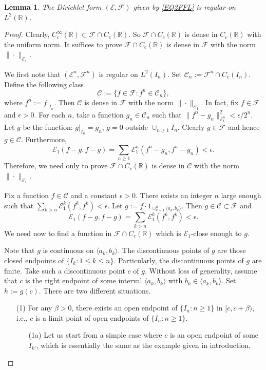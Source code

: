 \documentclass[a4paper]{amsart}
\newtheorem{lemma}[theorem]{Lemma}
\theoremstyle{definition}
\theoremstyle{remark}
\numberwithin{equation}{section}
\begin{document}
\begin{lemma}\label{LM212}
The Dirichlet form $({{\mathcal{E}}},{{\mathcal{F}}})$ given by \eqref{EQ2FFL} is regular on $L^2(\mathbb{R})$.
\end{lemma}
\begin{proof}
Clearly, $C_c^\infty(\mathbb{R})\subset {{\mathcal{F}}}\cap C_c(\mathbb{R})$. So ${{\mathcal{F}}}\cap C_c(\mathbb{R})$ is dense in $C_c(\mathbb{R})$ with the uniform norm. It suffices to prove ${{\mathcal{F}}}\cap C_c(\mathbb{R})$ is dense in ${{\mathcal{F}}}$ with the norm $\|\cdot\|_{{{\mathcal{E}}}_1}$.

We first note that $({{\mathcal{E}}}^n,{{\mathcal{F}}}^n)$ is regular on $L^2(I_n)$. Set $\mathcal{C}_n:={{\mathcal{F}}}^n\cap C_c(I_n)$. Define the following class
\[
	\mathcal{C}:= \{f\in {{\mathcal{F}}}: f^n\in \mathcal{C}_n\},
\]
where $f^n:=f|_{I_n}$. Then $\mathcal{C}$ is dense in ${{\mathcal{F}}}$ with the norm $\|\cdot\|_{{{\mathcal{E}}}_1}$. In fact, fix $f\in {{\mathcal{F}}}$ and $\epsilon>0$. For each $n$, take a function $g_n\in \mathcal{C}_n$ such that $\|f^n-g_n\|^2_{{{\mathcal{E}}}^n_1}<\epsilon/2^n$. Let $g$ be the function: $g|_{I_n}=g_n$, $g=0$ outside $\cup_{n\geq 1}I_n$. Clearly $g\in {{\mathcal{F}}}$ and hence $g\in \mathcal{C}$. Furthermore,
\[
	{{\mathcal{E}}}_1(f-g,f-g)=\sum_{n\geq 1}{{\mathcal{E}}}^n_1(f^n-g_n,f^n-g_n) <\epsilon.
\]
Therefore, we need only to prove ${{\mathcal{F}}}\cap C_c(\mathbb{R})$ is dense in $\mathcal{C}$ with the norm $\|\cdot\|_{{{\mathcal{E}}}_1}$.

Fix a function $f\in \mathcal{C}$ and a constant $\epsilon>0$. There exists an integer $n$ large enough such that $\sum_{k>n}{{\mathcal{E}}}_1^k(f^k,f^k)<\epsilon $. Let $g:=f\cdot 1_{\cup_{k=1}^n\langle a_k, b_k\rangle}$. Then $g\in \mathcal{C}\subset {{\mathcal{F}}}$ and \[
	{{\mathcal{E}}}_1(f-g,f-g)=\sum_{k>n}{{\mathcal{E}}}_1^k(f^k,f^k)<\epsilon.
\]
We need now to find a function in ${{\mathcal{F}}}\cap C_c(\mathbb{R})$ which is ${{\mathcal{E}}}_1$-close enough to $g$.

Note that $g$ is continuous on $\langle a_k, b_k\rangle$. The discontinuous points of $g$ are those closed endpoints of $\{I_k: 1\leq k\leq n\}$. Particularly, the discontinuous points of $g$ are finite. Take such a discontinuous point $c$ of $g$. Without loss of generality, assume that $c$ is the right endpoint of some interval $\langle a_k, b_k\rangle$ with $b_k\in \langle a_k, b_k\rangle$.  Set $h:=g(c)$. There are two different situations.
\begin{itemize}
\item[(1)] For any $\beta>0$, there exists an open endpoint of $\{I_n:n\ge 1\}$ in $[c,c+\beta)$, i.e., $c$ is a limit point of open endpoints of $\{I_n:n\ge 1\}$.
\begin{itemize}
\item[(1a)] Let us start from a simple case where
$c$ is an open endpoint of some $I_{k'}$, which is essentially the same as the example given in introduction.


\end{itemize}
\end{itemize}
\end{proof}
\end{document}
